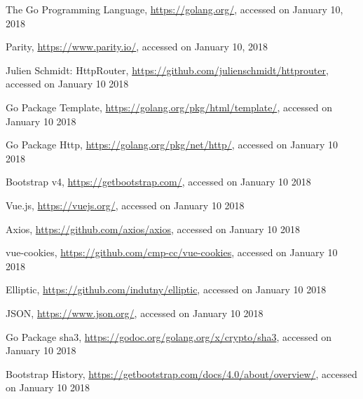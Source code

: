 \begin{thebibliography}{99}
 The Go Programming Language, \url{https://golang.org/}, accessed on January 10, 2018

 Parity, \url{https://www.parity.io/}, accessed on January 10, 2018

 Julien Schmidt: HttpRouter, \url{https://github.com/julienschmidt/httprouter}, accessed on January 10 2018

 Go Package Template, \url{https://golang.org/pkg/html/template/}, accessed on January 10 2018

 Go Package Http, \url{https://golang.org/pkg/net/http/}, accessed on January 10 2018

 Bootstrap v4, \url{https://getbootstrap.com/}, accessed on January 10 2018

 Vue.js, \url{https://vuejs.org/}, accessed on January 10 2018

 Axios, \url{https://github.com/axios/axios}, accessed on January 10 2018

 vue-cookies, \url{https://github.com/cmp-cc/vue-cookies}, accessed on January 10 2018

 Elliptic, \url{https://github.com/indutny/elliptic}, accessed on January 10 2018

 JSON, \url{https://www.json.org/}, accessed on January 10 2018

 Go Package sha3, \url{https://godoc.org/golang.org/x/crypto/sha3}, accessed on January 10 2018

 Bootstrap History, \url{https://getbootstrap.com/docs/4.0/about/overview/}, accessed on January 10 2018

\end{thebibliography}

